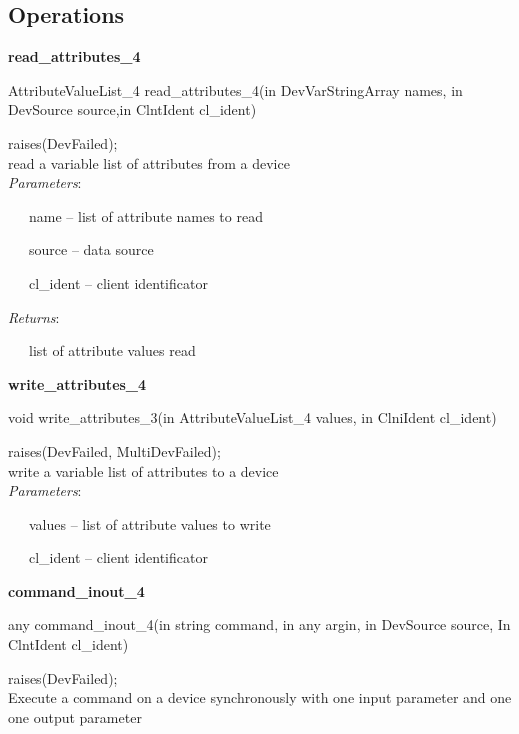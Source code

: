\subsection{Operations}

\textbf{read\_attributes\_4}

AttributeValueList\_4 read\_attributes\_4(in DevVarStringArray names,
in DevSource source,in ClntIdent cl\_ident)

raises(DevFailed);\\

read a variable list of attributes from a device\\

\emph{Parameters}:

~~~name – list of attribute names to read

~~~source – data source

~~~cl\_ident – client identificator

\emph{Returns}:

~~~list of attribute values read \textbf{}\\

\begin{flushleft}
\textbf{write\_attributes\_4}
\par\end{flushleft}

void write\_attributes\_3(in AttributeValueList\_4 values, in ClniIdent
cl\_ident)

raises(DevFailed, MultiDevFailed);\\

write a variable list of attributes to a device\\

\emph{Parameters}:

~~~values – list of attribute values to write

~~~cl\_ident – client identificator\\

\begin{flushleft}
\textbf{command\_inout\_4}
\par\end{flushleft}

any command\_inout\_4(in string command, in any argin, in DevSource
source, In ClntIdent cl\_ident)

raises(DevFailed);\\

Execute a command on a device synchronously with one input parameter
and one one output parameter\\


